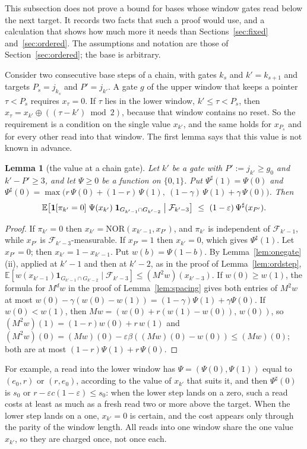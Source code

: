 \documentclass[11pt]{amsart}
\newtheorem{lemma}[theorem]{Lemma}
\theoremstyle{definition}
\theoremstyle{remark}
\newcommand{\eps}{\varepsilon}
\newcommand{\NOR}{\mathrm{NOR}}
\newcommand{\EE}{\mathbb{E}}
\newcommand{\cF}{\mathcal{F}}
\begin{document}
This subsection does not prove a bound for bases whose window gates read below the next target.
It records two facts that such a proof would use, and a calculation that shows how much more it
needs than Sections~\ref{sec:fixed} and~\ref{sec:ordered}. The assumptions and notation are
those of Section~\ref{sec:ordered}; the base is arbitrary.

Consider two consecutive base steps of a chain, with gates $k_s$ and $k'=k_{s+1}$ and targets
$P_s=j_{k_s}$ and $P'=j_{k'}$. A gate $g$ of the upper window that keeps a pointer
$\tau<P_s$ requires $x_\tau=0$. If $\tau$ lies in the lower window, $k'\le\tau<P_s$, then
$x_\tau=x_{k'}\oplus((\tau-k')\bmod2)$, because that window contains no reset. So the requirement
is a condition on the single value $x_{k'}$, and the same holds for $x_{P_s}$ and for every
other read into that window. The first lemma says that this value is not known in advance.

\begin{lemma}[the value at a chain gate]\label{lem:typebit}
Let $k'$ be a gate with $P':=j_{k'}\ge g_0$ and $k'-P'\ge3$, and let $\Psi\ge0$ be a function on
$\{0,1\}$. Put $\Psi^\sharp(1)=\Psi(0)$ and
$\Psi^\sharp(0)=\max\bigl(r\,\Psi(0)+(1-r)\,\Psi(1),\ (1-\gamma)\,\Psi(1)+\gamma\,\Psi(0)\bigr)$. Then
\[
\EE\bigl[\mathbf 1[\pi_{k'}=0]\;\Psi(x_{k'})\;\mathbf 1_{G_{k'-1}\cap G_{k'-2}}\bigm|\cF_{k'-3}\bigr]\ \le\ (1-\eps)\,\Psi^\sharp(x_{P'}) .
\]
\end{lemma}

\begin{proof}
If $\pi_{k'}=0$ then $x_{k'}=\NOR(x_{k'-1},x_{P'})$, and $\pi_{k'}$ is independent of
$\cF_{k'-1}$, while $x_{P'}$ is $\cF_{k'-3}$-measurable. If $x_{P'}=1$ then $x_{k'}=0$, which gives
$\Psi^\sharp(1)$. Let $x_{P'}=0$; then $x_{k'}=1-x_{k'-1}$. Put $w(b)=\Psi(1-b)$. By
Lemma~\ref{lem:onegate}(ii), applied at $k'-1$ and then at $k'-2$, as in the proof of
Lemma~\ref{lem:ordstep},
$\EE[w(x_{k'-1})\mathbf 1_{G_{k'-1}\cap G_{k'-2}}\mid\cF_{k'-3}]\le(M^2w)(x_{k'-3})$. If
$w(0)\ge w(1)$, the formula for $M^dw$ in the proof of Lemma~\ref{lem:spacing} gives both entries
of $M^2w$ at most
$w(0)-\gamma(w(0)-w(1))=(1-\gamma)\Psi(1)+\gamma\Psi(0)$. If $w(0)<w(1)$, then
$Mw=(w(0)+r(w(1)-w(0)),\,w(0))$, so $(M^2w)(1)=(1-r)w(0)+r\,w(1)$ and
$(M^2w)(0)=(Mw)(0)-\eps\beta((Mw)(0)-w(0))\le(Mw)(0)$; both are at most
$(1-r)\Psi(1)+r\,\Psi(0)$.
\end{proof}

\noindent For example, a read into the lower window has $\Psi=(\Psi(0),\Psi(1))$ equal to
$(e_0,r)$ or $(r,e_0)$, according to the value of $x_{k'}$ that suits it, and then
$\Psi^\sharp(0)$ is $s_0$ or $r-\eps c(1-\eps)\le s_0$: when the lower step lands on a zero, such
a read costs at least as much as a fresh read two or more above the target. When the lower step lands on a one,
$x_{k'}=0$ is certain, and the cost appears only through the parity of the window length. All
reads into one window share the one value $x_{k'}$, so they are charged once, not once each.
\end{document}
